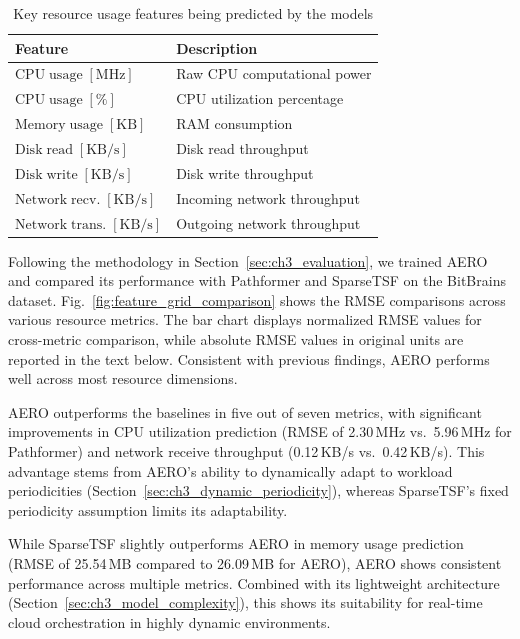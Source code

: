 \begin{table}
\centering
\renewcommand{\arraystretch}{1.15}
\begin{tabular}{p{}p{}}
\hline
\textbf{Feature} & \textbf{Description} \\
\hline
$\mathrm{CPU\;usage\;[MHz]}$ & Raw \ac{CPU} computational power \\
$\mathrm{CPU\;usage\;[\%]}$ & \ac{CPU} utilization percentage \\
$\mathrm{Memory\;usage\;[KB]}$ & \ac{RAM} consumption \\
$\mathrm{Disk\;read\;[KB/s]}$ & Disk read throughput \\
$\mathrm{Disk\;write\;[KB/s]}$ & Disk write throughput \\
$\mathrm{Network\;recv.\;[KB/s]}$ & Incoming network throughput \\
$\mathrm{Network\;trans.\;[KB/s]}$ & Outgoing network throughput \\
\hline
\end{tabular}
\caption{Key resource usage features being predicted by the models}
\label{tab:predicted_features}
\end{table}

Following the methodology in Section~\ref{sec:ch3_evaluation}, we trained \ac{AERO} and compared its performance with Pathformer and \ac{SparseTSF} on the \ac{BitBrains} dataset. Fig.~\ref{fig:feature_grid_comparison} shows the \ac{RMSE} comparisons across various resource metrics. The bar chart displays normalized \ac{RMSE} values for cross-metric comparison, while absolute \ac{RMSE} values in original units are reported in the text below. Consistent with previous findings, \ac{AERO} performs well across most resource dimensions.

\ac{AERO} outperforms the baselines in five out of seven metrics, with significant improvements in \ac{CPU} utilization prediction (\ac{RMSE} of 2.30\,\ac{MHz} vs.\ 5.96\,\ac{MHz} for Pathformer) and network receive throughput (0.12\,KB/s vs.\ 0.42\,KB/s). This advantage stems from \ac{AERO}'s ability to dynamically adapt to workload periodicities (Section~\ref{sec:ch3_dynamic_periodicity}), whereas \ac{SparseTSF}'s fixed periodicity assumption limits its adaptability.

While \ac{SparseTSF} slightly outperforms \ac{AERO} in memory usage prediction (\ac{RMSE} of 25.54\,MB compared to 26.09\,MB for \ac{AERO}), \ac{AERO} shows consistent performance across multiple metrics. Combined with its lightweight architecture (Section~\ref{sec:ch3_model_complexity}), this shows its suitability for real-time cloud orchestration in highly dynamic environments.

